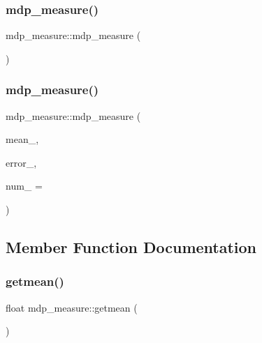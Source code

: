\subsubsection{\texorpdfstring{mdp\+\_\+measure()}{mdp\_measure()}\hspace{0.1cm}{\footnotesize\ttfamily [1/2]}}
{\footnotesize\ttfamily mdp\+\_\+measure\+::mdp\+\_\+measure (\begin{DoxyParamCaption}{ }\end{DoxyParamCaption})\hspace{0.3cm}{\ttfamily [inline]}}

\mbox{\label{classmdp__measure_a861159da4e045611fa06b937c63d91ab}} 
\subsubsection{\texorpdfstring{mdp\+\_\+measure()}{mdp\_measure()}\hspace{0.1cm}{\footnotesize\ttfamily [2/2]}}
{\footnotesize\ttfamily mdp\+\_\+measure\+::mdp\+\_\+measure (\begin{DoxyParamCaption}\item[{float}]{mean\+\_\+,  }\item[{float}]{error\+\_\+,  }\item[{int}]{num\+\_\+ = {} }\end{DoxyParamCaption})\hspace{0.3cm}{\ttfamily [inline]}}



\subsection{Member Function Documentation}
\mbox{\label{classmdp__measure_a6ac1b96bc356ea6b614a672b06dab833}} 
\subsubsection{\texorpdfstring{getmean()}{getmean()}}
{\footnotesize\ttfamily float mdp\+\_\+measure\+::getmean (\begin{DoxyParamCaption}{ }\end{DoxyParamCaption})\hspace{0.3cm}{\ttfamily [inline]}}

